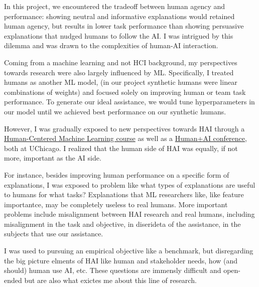 

In this project, we encountered the tradeoff between human agency and performance: showing neutral and informative explanations would retained human agency, but results in lower task performance than showing persuasive explanations that nudged humans to follow the AI. 
I was intrigued by this dilemma and was drawn to the complexities of human-AI interaction. 

Coming from a machine learning and not HCI background, my perspectives towards research were also largely influenced by ML. Specifically, I treated humans as another ML model, (in our project synthetic humans were linear combinations of weights) and focused solely on improving human or team task performance. To generate our ideal assistance, we would tune hyperparameters in our model until we achieved best performance on our synthetic humans.

However, I was gradually exposed to new perspectives towards HAI through a \href{https://github.com/ChicagoHAI/human-centered-machine-learning}{Human-Centered Machine Learning course} as well as a \href{https://datascience.uchicago.edu/events/human-ai-conference/}{Human+AI conference}, both at UChicago.
I realized that the human side of HAI was equally, if not more, important as the AI side. 

For instance, besides improving human performance on a specific form of explanations, I was exposed to problem like what types of explanations are useful to humans for what tasks? Explanations that ML researchers like, like feature importantce, may be completely useless to real humans.
More important problems include misalignment between HAI research and real humans, including misalignment in the task and objective, in diserideta of the assistance, in the subjects that use our assistance. 

I was used to pursuing an empirical objective like a benchmark, but disregarding the big picture elments of HAI like human and stakeholder needs, how (and should) human use AI, etc. These questions are immensly difficult and open-ended but are also what exictes me about this line of research.



